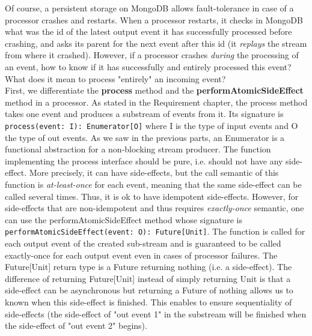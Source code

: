 Of course, a persistent storage on MongoDB allows fault-tolerance in case of a processor crashes and restarts. When a processor restarts, it checks in MongoDB what was the id of the latest output event it has successfully processed before crashing, and asks its parent for the next event after this id (it \textit{replays} the stream from where it crashed).
However, if a processor crashes \textit{during} the processing of an event, how to know if it has successfully and entirely processed this event? What does it mean to process "entirely" an incoming event?
\\

First, we differentiate the \textbf{process} method and the \textbf{performAtomicSideEffect} method in a processor. As stated in the Requirement chapter, the process method 
takes one event and produces a substream of events from it. Its signature is \verb|process(event: I): Enumerator[O]| where I is the type of input events and O the type
of out events. As we saw in the previous parts, an Enumerator is a functional abstraction for a non-blocking stream producer. The function implementing the process interface
should be pure, i.e. should not have any side-effect. More precisely, it can have side-effects, but the call semantic of this function is \textit{at-least-once} for each 
event, meaning that the same side-effect can be called several times. Thus, it is ok to have idempotent side-effects. However, for side-effects that are non-idempotent and
thus requires \textit{exactly-once} semantic, one can use the performAtomicSideEffect method whose signature is \verb|performAtomicSideEffect(event: O): Future[Unit]|.
The function is called for each output event of the created sub-stream and is guaranteed to be called exactly-once for each output event even in cases of processor failures. The
Future[Unit] return type is a Future returning nothing (i.e. a side-effect). The difference of returning Future[Unit] instead of simply returning Unit is that a side-effect
can be asynchronous but returning a Future of nothing allows us to known when this side-effect is finished. This enables to ensure sequentiality of side-effects (the side-effect
of "out event 1" in the substream will be finished when the side-effect of "out event 2" begins).
\\

